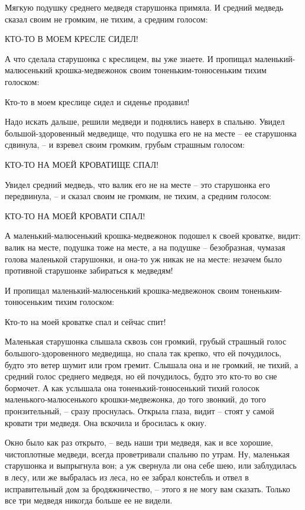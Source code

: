 Мягкую подушку среднего медведя старушонка примяла. И средний медведь сказал своим не громким, не тихим, а средним голосом:

КТО-ТО В МОЕМ КРЕСЛЕ СИДЕЛ!

А что сделала старушонка с креслицем, вы уже знаете. И пропищал маленький-малюсенький крошка-медвежонок своим тоненьким-тонюсеньким тихим голоском:

Кто-то в моем креслице сидел и сиденье продавил!

Надо искать дальше, решили медведи и поднялись наверх в спальню. Увидел большой-здоровенный медведище, что подушка его не на месте – ее старушонка сдвинула, – и взревел своим громким, грубым страшным голосом:

КТО-ТО НА МОЕЙ КРОВАТИЩЕ СПАЛ!

Увидел средний медведь, что валик его не на месте – это старушонка его передвинула, – и сказал своим не громким, не тихим, а средним голосом:

КТО-ТО НА МОЕЙ КРОВАТИ СПАЛ!

А маленький-малюсенький крошка-медвежонок подошел к своей кроватке, видит: валик на месте, подушка тоже на месте, а на подушке – безобразная, чумазая голова маленькой старушонки, и она-то уж никак не на месте: незачем было противной старушонке забираться к медведям!

И пропищал маленький-малюсенький крошка-медвежонок своим тоненьким-тонюсеньким тихим голоском:

Кто-то на моей кроватке спал и сейчас спит!

Маленькая старушонка слышала сквозь сон громкий, грубый страшный голос большого-здоровенного медведища, но спала так крепко, что ей почудилось, будто это ветер шумит или гром гремит. Слышала она и не громкий, не тихий, а средний голос среднего медведя, но ей почудилось, будто это кто-то во сне бормочет. А как услышала она тоненький-тонюсенький тихий голосок маленького-малюсенького крошки-медвежонка, до того звонкий, до того пронзительный, – сразу проснулась. Открыла глаза, видит – стоят у самой кровати три медведя. Она вскочила и бросилась к окну.

Окно было как раз открыто, – ведь наши три медведя, как и все хорошие, чистоплотные медведи, всегда проветривали спальню по утрам. Ну, маленькая старушонка и выпрыгнула вон; а уж свернула ли она себе шею, или заблудилась в лесу, или же выбралась из леса, но ее забрал констебль и отвел в исправительный дом за бродяжничество, – этого я не могу вам сказать. Только все три медведя никогда больше ее не видели.

